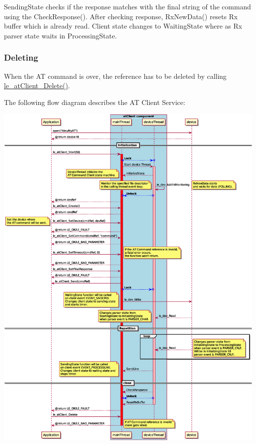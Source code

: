 Sending\+State checks if the response matches with the final string of the command using the Check\+Response(). After checking response, Rx\+New\+Data() resets Rx buffer which is already read. Client state changes to Waiting\+State where as Rx parser state waits in Processing\+State.\hypertarget{c_SDD_atClient_atClient__delete}{}\subsubsection{Deleting}\label{c_SDD_atClient_atClient__delete}
When the AT command is over, the reference has to be deleted by calling \hyperlink{le__at_client__interface_8h_a8bd3f6ec64a7a700460e4d66b39ec4ed}{le\+\_\+at\+Client\+\_\+\+Delete()}.

The following flow diagram describes the AT Client Service\+:


\begin{DoxyImageNoCaption}
  \mbox{\includegraphics[width=\textwidth,height=\textheight/2,keepaspectratio=true]{le_atClient}}
\end{DoxyImageNoCaption}


